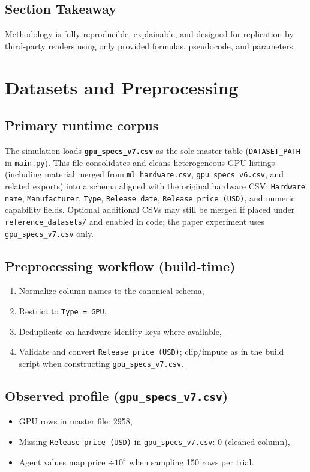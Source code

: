 \documentclass[journal]{IEEEtran}
\begin{document}
\subsection{Section Takeaway}
Methodology is fully reproducible, explainable, and designed for replication by third-party readers using only provided formulas, pseudocode, and parameters.

\section{Datasets and Preprocessing}
\subsection{Primary runtime corpus}
The simulation loads \textbf{\texttt{gpu\_specs\_v7.csv}} as the sole master table (\texttt{DATASET\_PATH} in \texttt{main.py}). This file consolidates and cleans heterogeneous GPU listings (including material merged from \texttt{ml\_hardware.csv}, \texttt{gpu\_specs\_v6.csv}, and related exports) into a schema aligned with the original hardware CSV: \texttt{Hardware name}, \texttt{Manufacturer}, \texttt{Type}, \texttt{Release date}, \texttt{Release price (USD)}, and numeric capability fields. Optional additional CSVs may still be merged if placed under \texttt{reference\_datasets/} and enabled in code; the paper experiment uses \texttt{gpu\_specs\_v7.csv} only.

\subsection{Preprocessing workflow (build-time)}
\begin{enumerate}[leftmargin=*]
    \item Normalize column names to the canonical schema,
    \item Restrict to \texttt{Type = GPU},
    \item Deduplicate on hardware identity keys where available,
    \item Validate and convert \texttt{Release price (USD)}; clip/impute as in the build script when constructing \texttt{gpu\_specs\_v7.csv}.
\end{enumerate}

\subsection{Observed profile (\texttt{gpu\_specs\_v7.csv})}
\begin{itemize}[leftmargin=*]
    \item GPU rows in master file: 2958,
    \item Missing \texttt{Release price (USD)} in \texttt{gpu\_specs\_v7.csv}: 0 (cleaned column),
    \item Agent values map price $\div 10^4$ when sampling 150 rows per trial.
\end{itemize}
\end{document}
